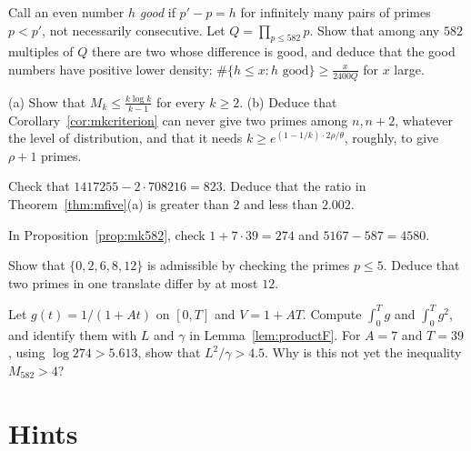 \begin{exercise}[$\star\star$]\label{ex:gooddiff}
Call an even number $h$ \emph{good} if $p'-p=h$ for infinitely many pairs of primes $p<p'$, not necessarily consecutive. Let $Q=\prod_{p\le582}p$. Show that among any $582$ multiples of $Q$ there are two whose difference is good, and deduce that the good numbers have positive lower density: $\#\{h\le x:h\text{ good}\}\ge\frac x{2400Q}$ for $x$ large.
\end{exercise}

\begin{exercise}[$\star\star\star$]\label{ex:upper}
(a) Show that $M_k\le\frac{k\log k}{k-1}$ for every $k\ge2$.
(b) Deduce that Corollary~\ref{cor:mkcriterion} can never give two primes among $n,n+2$, whatever the level of distribution, and that it needs $k\ge e^{(1-1/k)\cdot2\rho/\theta}$, roughly, to give $\rho+1$ primes.
\end{exercise}

\begin{exercise}[$\star$]\label{ex:v14-extra-09-1}
Check that $1417255-2\cdot708216=823$. Deduce that the ratio in Theorem~\ref{thm:mfive}(a) is greater than $2$ and less than $2.002$.
\end{exercise}

\begin{exercise}[$\star$]\label{ex:v14-extra-09-2}
In Proposition~\ref{prop:mk582}, check $1+7\cdot39=274$ and $5167-587=4580$.
\end{exercise}

\begin{exercise}[$\star\star$]\label{ex:v14-extra-09-3}
Show that $\{0,2,6,8,12\}$ is admissible by checking the primes $p\le5$. Deduce that two primes in one translate differ by at most $12$.
\end{exercise}

\begin{exercise}[$\star\star\star$]\label{ex:v14-extra-09-4}
Let $g(t)=1/(1+At)$ on $[0,T]$ and $V=1+AT$. Compute $\int_0^T g$ and $\int_0^T g^2$, and identify them with $L$ and $\gamma$ in Lemma~\ref{lem:productF}. For $A=7$ and $T=39$, using $\log274>5.613$, show that $L^2/\gamma>4.5$. Why is this not yet the inequality $M_{582}>4$?
\end{exercise}

\section{Hints}

